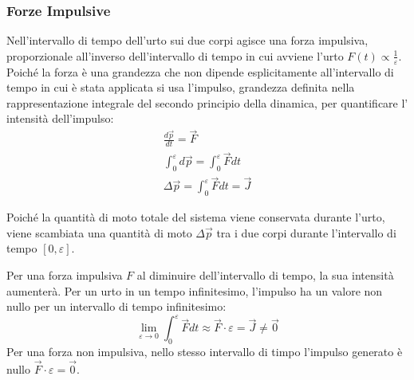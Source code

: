 \documentclass{article}
\numberwithin{equation}{subsection}
\begin{document}
\subsubsection{Forze Impulsive}
Nell'intervallo di tempo dell'urto sui due corpi agisce una 
forza impulsiva, proporzionale all'inverso dell'intervallo di tempo in cui avviene l'urto 
$F(t)\propto \displaystyle\frac{1}{\varepsilon}$. 
Poiché la forza è una grandezza che non dipende esplicitamente all'intervallo di 
tempo in cui è stata applicata si usa l'impulso, grandezza definita nella rappresentazione integrale del secondo principio della dinamica, per quantificare 
l'\\intensità dell'impulso: 
\begin{gather*}
    \displaystyle\frac{d\vec{p}}{dt}=\vec{F}\\
    \displaystyle\int_{0}^{\varepsilon}d\vec{p}=\int_{0}^{\varepsilon}\vec{F}dt\\
    \Delta\vec{p}=\displaystyle\int_{0}^{\varepsilon}\vec{F}dt=\vec{J}
\end{gather*}

Poiché la quantità di moto totale del sistema viene conservata 
durante l'urto, viene scambiata una quantità di moto $\Delta\vec{p}$ 
tra i due corpi durante l'intervallo di tempo $[0,\varepsilon]$. 

Per una forza impulsiva $F$ al diminuire dell'intervallo di tempo, la sua intensità aumenterà. Per un urto in un tempo infinitesimo, 
l'impulso ha un valore non nullo per un intervallo di tempo infinitesimo:
\begin{equation*}
    \lim_{\varepsilon\to 0}\displaystyle\int_{0}^{\varepsilon}\vec{F}dt\approx\vec{F}\cdot\varepsilon=\vec{J}\neq\vec{0}
\end{equation*}
Per una forza non impulsiva, nello stesso intervallo di timpo l'impulso generato è nullo $\vec{F}\cdot\varepsilon=\vec{0}$. 

\begin{center}\end{center}
\end{document}
